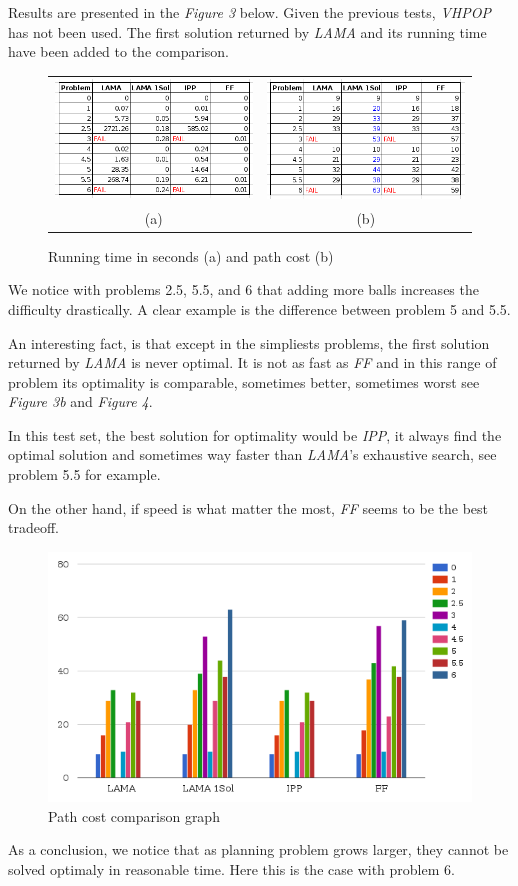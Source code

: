 Results are presented in the \textit{Figure 3} below. Given the previous tests,
\textit{VHPOP} has not been used. The first solution returned by \textit{LAMA}
and its running time have been added to the comparison.

\begin{figure}[h]
    \centering
    \begin{tabular}{cc}
      \includegraphics[width=.49\linewidth,scale=1]{./images/tab3.png} &
\includegraphics[width=.49\linewidth, scale=1.5]{./images/tab4.png} \\
      (a) & (b)
    \end{tabular}
    \caption{Running time in seconds (a) and path cost (b)}
\end{figure}


We notice with problems 2.5, 5.5, and 6 that adding more balls
increases the difficulty drastically. A clear example is the difference
between problem 5 and 5.5.

An interesting fact, is that except in the simpliests problems, the first
solution returned by \textit{LAMA} is never optimal. It is not as fast as
\textit{FF} and in this range of problem its optimality is comparable, sometimes
better, sometimes worst see \textit{Figure 3b} and \textit{Figure 4}.

In this test set, the best solution for optimality would be \textit{IPP}, it
always find the optimal solution and sometimes way faster than \textit{LAMA}'s
exhaustive search, see problem 5.5 for example.

On the other hand, if speed is what matter the most, \textit{FF} seems to be
the best tradeoff.

\newpage
\thispagestyle{empty}
\begin{figure}[h]
    \centering
      \includegraphics[width=.65\linewidth,scale=1]{./images/graph.png}
    \caption{Path cost comparison graph}
\end{figure}

As a conclusion, we notice that as planning problem grows larger, they
cannot be solved optimaly in reasonable time. Here this is the case with problem
6.
